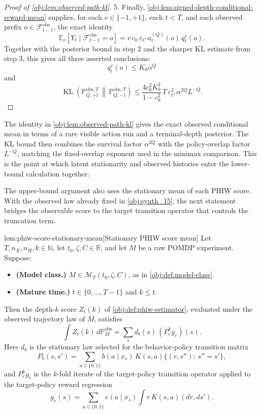 \documentclass[11pt]{article}
\begin{document}
\begin{proof}[Proof of \cref{obj:lem:observed-path-kl}]
5.  Finally, \cref{obj:lem:signed-depth-conditional-reward-mean} supplies, for each \(v\in\{-1,+1\}\), each \(t<T\), and each observed prefix \(o\in\mathcal F_{t-1}^{\mathrm{obs}}\), the exact identity
\[
\mathbb E_v[Y_t\mid \mathcal F_{t-1}^{\mathrm{obs}}=o]
=
v\,c_0\,\varepsilon_C\,a_t^{(Q)}(o)\,q_t^v(o).
\]
Together with the posterior bound in step 2 and the sharper KL estimate from step 3, this gives all three asserted conclusions:
\[
q_t^v(o)\le K_0\alpha^Q
\]
and
\[
\operatorname{KL}\!\left(
\mathbb P_{Q,+1}^{\mathrm{obs},T}
\,\middle\|\,
\mathbb P_{Q,-1}^{\mathrm{obs},T}
\right)
\le
\frac{4c_0^2K_0^2}{1-c_0^2}\,
T\,\varepsilon_C^2\,\alpha^{2Q}L^{-Q}.
\] %
\end{proof}

The identity in \cref{obj:lem:observed-path-kl} gives the exact observed conditional mean in terms of a rare visible action run and a terminal-depth posterior. The KL bound then combines the survival factor \(\alpha^{2Q}\) with the policy-overlap factor \(L^{-Q}\), matching the fixed-overlap exponent used in the minimax comparison. This is the point at which latent stationarity and observed histories enter the lower-bound calculation together.

The upper-bound argument also uses the stationary mean of each PHIW score. With the observed law already fixed in \cref{obj:synth_15}, the next statement bridges the observable score to the target transition operator that controls the truncation term.

\begin{lemmav}{lem:phiw-score-stationary-mean}[Stationary PHIW score mean]
Let \(T,n_X,n_H,k\in\mathbb N\), let \(t_0,\zeta,C\in\mathbb R\), and let \(M\) be a raw POMDP experiment. Suppose:
\begin{itemize}
\item \textbf{(Model class.)} \(M\in\mathcal M_T(t_0,\zeta,C)\), as in \cref{obj:def:model-class}.
\item \textbf{(Mature time.)} \(t\in\{0,\ldots,T-1\}\) and \(k\le t\).
\end{itemize}
Then the depth-\(k\) score \(Z_t(k)\) of \cref{obj:def:phiw-estimator}, evaluated under the observed trajectory law of \(M\), satisfies
\[
\int Z_t(k)\,d\mathbb P_M^{\mathrm{obs}}
=
\sum_s d_b(s)\,(P_e^k g_e)(s).
\]
Here \(d_b\) is the stationary law selected for the behavior-policy transition matrix
\[
P_b(s,s')=\sum_{a\in\{0,1\}} b(a\mid x_s)\,K(s,a)\{(r,s''):\ s''=s'\},
\]
and \(P_e^k g_e\) is the \(k\)-fold iterate of the target-policy transition operator applied to the target-policy reward regression
\[
g_e(s)=\sum_{a\in\{0,1\}} e(a\mid x_s)\int r\,K(s,a)(d r,d s').
\]
\end{lemmav}
\end{document}
